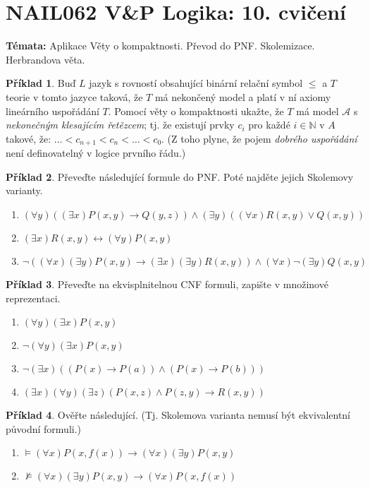 \documentclass[a4paper]{article}
\theoremstyle{definition}
\newtheorem{problem}{Příklad}
\begin{document}
\section*{NAIL062 V\&P Logika: 10. cvičení}


\textbf{Témata:}
Aplikace Věty o kompaktnosti. Převod do PNF. Skolemizace. Herbrandova věta.


\medskip\begin{problem} Buď $L$ jazyk s rovností obsahující binární relační symbol $\le$ a $T$ teorie v tomto jazyce taková, že $T$ má nekončený model a platí v ní axiomy lineárního uspořádání $T$. Pomocí věty o kompaktnosti ukažte, že $T$ má model $\mathcal{A}$ s \emph{nekonečným klesajícím řetězcem}; tj. že existují prvky $c_i$ pro každé $i\in \mathbb{N}$ v $A$ takové, že: $\dots < c_{n+1} < c_n< \dots <c_0$.
    (Z toho plyne, že pojem \emph{dobrého uspořádání} není definovatelný v logice prvního řádu.)
\end{problem}


\medskip\begin{problem} Převeďte následující formule do PNF. Poté najděte jejich Skolemovy varianty.
\begin{enumerate}
    \item $(\forall y)((\exists x)P(x,y)\to Q(y,z))\wedge (\exists y)((\forall x)R(x,y)\vee Q(x,y))$
    \item $(\exists x)R(x,y)\leftrightarrow (\forall y)P(x,y)$
    \item $\neg((\forall x)(\exists y)P(x,y)\to (\exists x)(\exists y)R(x,y))\wedge(\forall x)\neg(\exists y)Q(x,y)$
\end{enumerate}
\end{problem}


\medskip\begin{problem} Převeďte na ekvisplnitelnou CNF formuli, zapište v množinové reprezentaci.
\begin{enumerate}
    \item $(\forall y)(\exists x)P(x,y)$
    \item $\neg (\forall y)(\exists x)P(x,y)$
    \item $\neg (\exists x)((P(x)\to P(a))\wedge (P(x)\to P(b)))$
    \item $(\exists x)(\forall y)(\exists z)(P(x,z)\wedge P(z,y) \to R(x,y))$
\end{enumerate}
\end{problem}

    
\medskip\begin{problem} Ověřte následující. (Tj. Skolemova varianta nemusí být ekvivalentní původní formuli.)
\begin{enumerate}
    \item $\models (\forall x)P(x,f(x)) \to (\forall x)(\exists y)P(x,y)$
    \item $\not\models (\forall x)(\exists y)P(x,y)\to (\forall x)P(x,f(x))$
\end{enumerate}

\end{problem}
\end{document}
